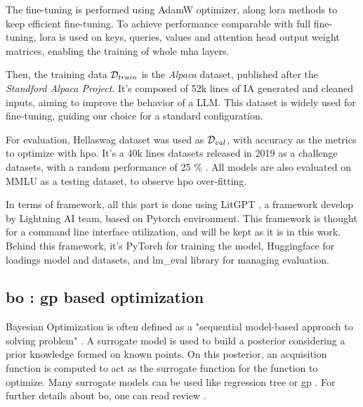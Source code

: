 The fine-tuning is performed using AdamW \cite{loshchilov_decoupled_2019} optimizer, along \acrshort{lora} methods to keep efficient fine-tuning. To achieve performance comparable with full fine-tuning, \acrshort{lora} is used on keys, queries, values and attention head output weight matrices, enabling the training of whole \acrfull{mha} layers. 

Then, the training data $\mathcal{D}_{train}$ is the \textit{Alpaca} dataset, published after the \textit{Standford Alpaca Project}. It's composed of 52k lines of IA generated and cleaned inputs, aiming to improve the behavior of a LLM. This dataset is widely used \cite{dettmers_qlora_2023,chung_scaling_2024,zhou_lima_2023} for fine-tuning, guiding our choice for a standard configuration. 

For evaluation, Hellaswag \cite{zellers_hellaswag_2019} dataset was used as $\mathcal{D}_{val}$, with accuracy as the metrics to optimize with \acrshort{hpo}. It's a 40k lines datasets released in 2019 as a challenge datasets, with a random performance of 25 \% . All models are also evaluated on MMLU \cite{hendryckstest2021} as a testing dataset, to observe \acrshort{hpo} over-fitting. 

In terms of framework, all this part is done using LitGPT \cite{the_lightning_ai_team_litgpt_2023}, a framework develop by Lightning AI team, based on Pytorch  \cite{ansel_pytorch_2024} environment. This framework is thought for a command line interface utilization, and will be kept as it is in this work. Behind this framework, it's PyTorch for training the model, Huggingface for loadings model and datasets, and lm\_eval library for managing evaluation.

\subsection{\acrfull{bo} : \acrfull{gp} based optimization}
\label{sec:bo}

Bayesian Optimization is often defined as a "sequential model-based approach to solving problem" \cite{shahriari_taking_2016}. A surrogate model is used to build a posterior considering a prior knowledge formed on known points. On this posterior, an acquisition function is computed to act as the surrogate function for the function to optimize. Many surrogate models can be used like regression tree \cite{ammari_linear_2023} or \acrfull{gp} \cite{rajaram_empirical_2021}. For further details about \acrshort{bo}, one can read review \cite{shahriari_taking_2016}.

